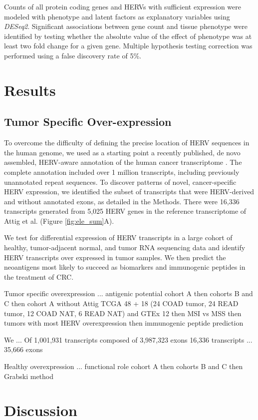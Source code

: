 \documentclass[11pt,letterpaper]{article}
\begin{document}
Counts of all protein coding genes and HERVs with sufficient expression were modeled with phenotype and latent factors as explanatory variables using \emph{DESeq2}.
Significant associations between gene count and tissue phenotype were identified by testing whether the absolute value of the effect of phenotype was at least two fold change for a given gene.
Multiple hypothesis testing correction was performed using a false discovery rate of 5\%.

\section*{Results}
\subsection*{Tumor Specific Over-expression}
To overcome the difficulty of defining the precise location of HERV sequences in the human genome, we used as a starting point a recently published, de novo assembled, HERV-aware annotation of the human cancer transcriptome \citep{Attig2019}.
The complete annotation included over 1 million transcripts, including previously unannotated repeat sequences.
To discover patterns of novel, cancer-specific HERV expression, we identified the subset of transcripts that were HERV-derived and without annotated exons, as detailed in the Methods.
There were 16,336 transcripts generated from 5,025 HERV genes in the reference transcriptome of Attig et al. (Figure \ref{fig:ele_sum}A).



We test for differential expression of HERV transcripts in a large cohort of healthy, tumor-adjacent normal, and tumor RNA sequencing data and identify HERV transcripts over expressed in tumor samples.
We then predict the neoantigens most likely to succeed as biomarkers and immunogenic peptides in the treatment of CRC.


Tumor specific overexpression ... antigenic potential
cohort A
then cohorts B and C
then cohort A without Attig TCGA 48 + 18 (24 COAD tumor, 24 READ tumor, 12 COAD NAT, 6 READ NAT) and GTEx 12
then MSI vs MSS
then tumors with most HERV overexpression
then immunogenic peptide prediction

We ...
Of 1,001,931 transcripts composed of 3,987,323 exons 16,336 transcripts ... 35,666 exons

Healthy overexpression ... functional role
cohort A
then cohorts B and C
then Grabski method

\section*{Discussion}
\end{document}
